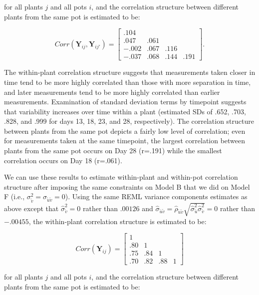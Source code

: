 \documentclass[
]{krantz}
\begin{document}
for all plants \(j\) and all pots \(i\), and the correlation structure between different plants from the same pot is estimated to be:

\[  Corr(\textbf{Y}_{ij},\textbf{Y}_{ij'}) = \left[
          \begin{array}{cccc}
            .104 & & & \\
            .047 & .061 & & \\
            -.002 & .067 & .116 & \\
            -.037 & .068 & .144 & .191
          \end{array} \right]. \]

The within-plant correlation structure suggests that measurements taken closer in time tend to be more highly correlated than those with more separation in time, and later measurements tend to be more highly correlated than earlier measurements. Examination of standard deviation terms by timepoint suggests that variability increases over time within a plant (estimated SDs of .652, .703, .828, and .999 for days 13, 18, 23, and 28, respectively). The correlation structure between plants from the same pot depicts a fairly low level of correlation; even for measurements taken at the same timepoint, the largest correlation between plants from the same pot occurs on Day 28 (r=.191) while the smallest correlation occurs on Day 18 (r=.061).

We can use these results to estimate within-plant and within-pot correlation structure after imposing the same constraints on Model B that we did on Model F (i.e., \(\sigma_{\tilde{v}}^{2}=\sigma_{\tilde{u}\tilde{v}}=0\)). Using the same REML variance components estimates as above except that \(\hat{\sigma}_{\tilde{v}}^{2}=0\) rather than \(.00126\) and \(\hat{\sigma}_{\tilde{u}\tilde{v}}=\hat{\rho}_{\tilde{u}\tilde{v}}\sqrt{\hat{\sigma}_{\tilde{u}}^{2}\hat{\sigma}_{\tilde{v}}^{2}}=0\) rather than \(-.00455\), the within-plant correlation structure is estimated to be:

\[  Corr(\textbf{Y}_{ij}) = \left[
          \begin{array}{cccc}
            1 & & & \\
            .80 & 1 & & \\
            .75 & .84 & 1 & \\
            .70 & .82 & .88 & 1
          \end{array} \right] \]

for all plants \(j\) and all pots \(i\), and the correlation structure between different plants from the same pot is estimated to be:
\end{document}
